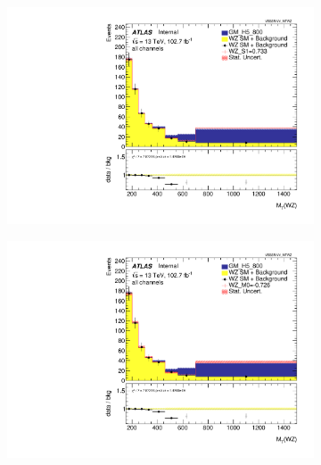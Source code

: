 \documentclass[../Bachelorarbeit.tex]{subfiles}
\begin{document}
\begin{figure}[h]

    \centering
    \begin{subfigure}{0.3\textwidth}
        \includegraphics[width=\textwidth]{Plots/ALL_MTWZ_final/GM_H5_800/S1/2022-05-07/VBSSR/all_VV_MTWZ.pdf}
    \end{subfigure}
    \begin{subfigure}{0.3\textwidth}
        \includegraphics[width=\textwidth]{Plots/ALL_MTWZ_final/GM_H5_800/M0/2022-05-07/VBSSR/all_VV_MTWZ.pdf}
    \end{subfigure}
    \begin{subfigure}{0.3\textwidth}

\end{subfigure}
\end{figure}
\end{document}
